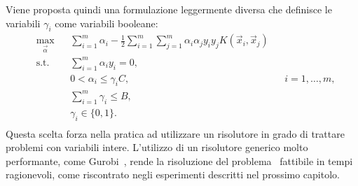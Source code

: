 Viene proposta quindi una formulazione leggermente diversa che definisce le variabili $\gamma_i$ come variabili booleane:
\begin{equation}\label{eq:budget_svc:binary_gamma_formulation}
\begin{aligned}
& \max_{\vec{\alpha}}    && \sum_{i=1}^{m}\alpha_i - \frac{1}{2}\sum_{i=1}^{m}\sum_{j=1}^{m}\alpha_i\alpha_jy_iy_jK(\Vec{x}_i, \Vec{x}_j)\\
& \textrm{s.t.} && \sum_{i=1}^{m} \alpha_iy_i = 0,                   \\
&               && 0 < \alpha_i \leq \gamma_iC,   && i=1,\dots,m,  \\
&               && \sum_{i=1}^{m} \gamma_i \leq B,                  \\
&               && \gamma_i \in \{0,1\}.                            \\
\end{aligned}
\end{equation}
Questa scelta forza nella pratica ad utilizzare un risolutore in grado di trattare problemi con variabili intere.
L'utilizzo di un risolutore generico molto performante, come Gurobi~\cite{gurobi}, rende la risoluzione del problema~ fattibile in tempi ragionevoli, come riscontrato negli esperimenti descritti nel prossimo capitolo.
